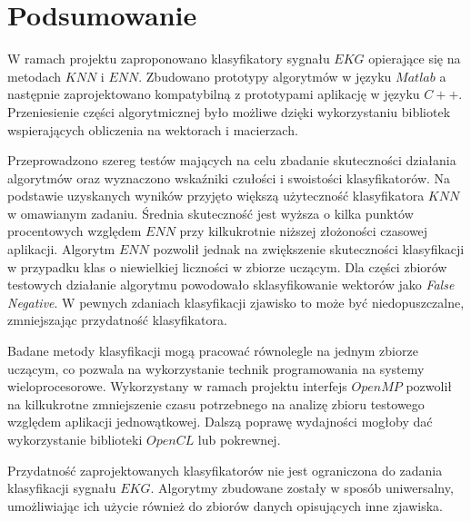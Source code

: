 \section*{Podsumowanie}

W ramach projektu zaproponowano klasyfikatory sygnału $EKG$ opierające się na metodach $KNN$ i $ENN$. Zbudowano prototypy algorytmów w języku $Matlab$ a następnie zaprojektowano kompatybilną z prototypami aplikację w języku $C++$. Przeniesienie części algorytmicznej było możliwe dzięki wykorzystaniu bibliotek wspierających obliczenia na wektorach i macierzach. 

Przeprowadzono szereg testów mających na celu zbadanie skuteczności działania algorytmów oraz wyznaczono wskaźniki czułości i swoistości klasyfikatorów. Na podstawie uzyskanych wyników przyjęto większą użyteczność klasyfikatora $KNN$ w omawianym zadaniu. Średnia skuteczność jest wyższa o kilka punktów procentowych względem $ENN$ przy kilkukrotnie niższej złożoności czasowej aplikacji. Algorytm $ENN$ pozwolił jednak na zwiększenie skuteczności klasyfikacji w przypadku klas o niewielkiej liczności w zbiorze uczącym. Dla części zbiorów testowych działanie algorytmu powodowało sklasyfikowanie wektorów jako \textit{False Negative}. W pewnych zdaniach klasyfikacji zjawisko to może być niedopuszczalne, zmniejszając przydatność klasyfikatora.

Badane metody klasyfikacji mogą pracować równolegle na jednym zbiorze uczącym, co pozwala na wykorzystanie technik programowania na systemy wieloprocesorowe. Wykorzystany w ramach projektu interfejs $OpenMP$ pozwolił na kilkukrotne zmniejszenie czasu potrzebnego na analizę zbioru testowego względem aplikacji jednowątkowej. Dalszą poprawę wydajności mogłoby dać wykorzystanie biblioteki $OpenCL$ lub pokrewnej.

Przydatność zaprojektowanych klasyfikatorów nie jest ograniczona do zadania klasyfikacji sygnału $EKG$. Algorytmy zbudowane zostały w sposób uniwersalny, umożliwiając ich użycie również do zbiorów danych opisujących inne zjawiska.
